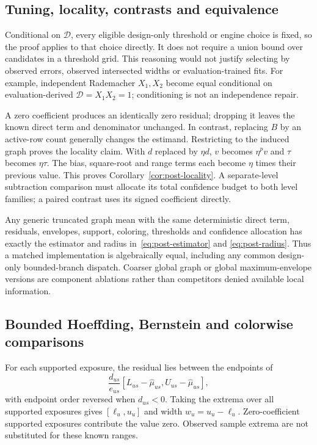 \subsection{Tuning, locality, contrasts and equivalence}

Conditional on $\mathcal D$, every eligible design-only threshold or engine
choice is fixed, so the proof applies to that choice directly. It does not
require a union bound over candidates in a threshold grid. This reasoning
would not justify selecting by observed errors, observed intersected widths
or evaluation-trained fits. For example, independent Rademacher $X_1,X_2$
become equal conditional on evaluation-derived $\mathcal D=X_1X_2=1$;
conditioning is not an independence repair.

A zero coefficient produces an identically zero residual; dropping it leaves
the known direct term and denominator unchanged. In contrast, replacing $B$
by an active-row count generally changes the estimand. Restricting to the
induced graph proves the locality claim. With $d$ replaced by $\eta d$,
$v$ becomes $\eta^pv$ and $\tau$ becomes $\eta\tau$. The bias, square-root
and range terms each become $\eta$ times their previous value. This proves
Corollary~\ref{cor:post-locality}. A separate-level subtraction comparison
must allocate its total confidence budget to both level families; a paired
contrast uses its signed coefficient directly.

Any generic truncated graph mean with the same deterministic direct term,
residuals, envelopes, support, coloring, thresholds and confidence allocation
has exactly the estimator and radius in~\eqref{eq:post-estimator} and
\eqref{eq:post-radius}. Thus a matched implementation is algebraically equal,
including any common design-only bounded-branch dispatch. Coarser global graph
or global maximum-envelope versions are component ablations rather than
competitors denied available local information.

\subsection{Bounded Hoeffding, Bernstein and colorwise comparisons}

For each supported exposure, the residual lies between the endpoints of
\begin{equation}
 \frac{d_{us}}{e_{us}}[L_{us}-\widehat\mu_{us},
                       U_{us}-\widehat\mu_{us}],
 \label{eq:post-proof-actual-range}
\end{equation}
with endpoint order reversed when $d_{us}<0$. Taking the extrema over all
supported exposures gives $[\ell_u,u_u]$ and width $w_u=u_u-\ell_u$.
Zero-coefficient supported exposures contribute the value zero. Observed
sample extrema are not substituted for these known ranges.

